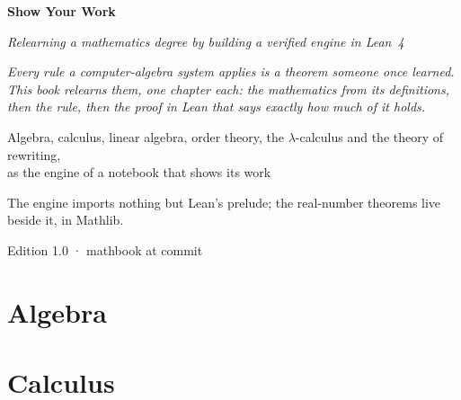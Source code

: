 \documentclass[12pt, a4paper, openright]{book}
\theoremstyle{thmstyle}
\theoremstyle{defstyle}
\begin{document}
\frontmatter

\begin{titlepage}
  \centering
  \vspace*{2cm}
  {\Huge\bfseries Show Your Work\par}
  \vspace{0.5cm}
  {\large\itshape Relearning a mathematics degree by building a verified engine in Lean~4\par}
  \vspace{3cm}
  \begin{tcolorbox}[width=0.75\textwidth, colback=gray!8, colframe=gray!50, arc=4pt, boxrule=0.6pt]
    \small\centering
    \textit{Every rule a computer-algebra system applies is a theorem someone once learned.\\
    This book relearns them, one chapter each: the mathematics from its definitions,\\
    then the rule, then the proof in Lean that says exactly how much of it holds.}
  \end{tcolorbox}
  \vfill
  {\large Algebra, calculus, linear algebra, order theory, the \(\lambda\)-calculus and the theory of rewriting,\\
  as the engine of a notebook that shows its work\par}
  \vspace{1cm}
  {\normalsize The engine imports nothing but Lean's prelude; the real-number theorems live beside it, in Mathlib.\par}
  \vspace{0.5cm}
  {\small\color{gray} Edition 1.0 · mathbook at commit \texttt{}\par}
\end{titlepage}


\tableofcontents

\mainmatter
\part{Algebra}






\part{Calculus}




\end{document}
